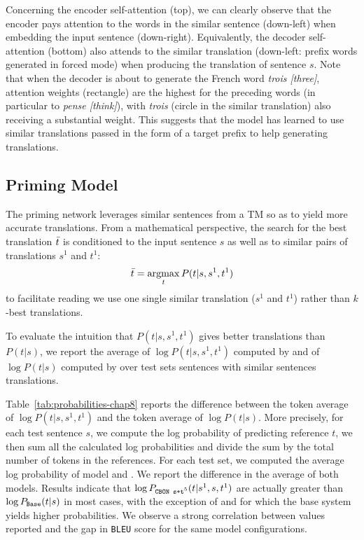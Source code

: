 Concerning the encoder self-attention (top), we can clearly observe that the encoder pays attention to the words in the similar sentence (down-left) when embedding the input sentence (down-right). 
%
Equivalently, the decoder self-attention (bottom) also attends to the similar translation (down-left: prefix words generated in forced mode) when producing the translation of sentence $s$. Note that when the decoder is about to generate the French word {\it trois [three]}, attention weights (rectangle) are the highest for the preceding words (in particular to {\it pense [think]}), with {\it trois} (circle in the similar translation) also receiving a substantial weight.
This suggests that the model has learned to use similar translations passed in the form of a target prefix to help generating translations.

\subsection*{Priming Model} 
The priming network leverages similar sentences from a TM so as to yield more accurate translations. From a mathematical perspective, the search for the best translation $\Bar{t}$ is conditioned to the input sentence $s$ as well as to similar pairs of translations $s^1$ and $t^1$:
\begin{equation*}
    \Bar{t} = \mathop{\operatorname*{argmax}}_{t}P(t|s,s^1,t^1)
\end{equation*}
\noindent to facilitate reading we use one single similar translation ($s^1$ and $t^1$) rather than $k$-best translations.

To evaluate the intuition that $P(t|s, s^1,t^1)$ gives better translations than $P(t|s)$, we report the average of $\log P(t|s,s^1,t^1)$ computed by  and of $\log P(t|s)$ computed by  over test sets sentences with similar sentences translations.

Table~\ref{tab:probabilities-chap8} reports the difference between the token average of $\log P(t|s,s^1,t^1)$ and the token average of $\log P(t|s)$. More precisely, for each test sentence $s$, we compute the log probability of predicting reference $t$, we then sum all the calculated log probabilities and divide the sum by the total number of tokens in the references. For each test set, we computed the average log probability of model  and . We report the difference in the average of both models. 
Results indicate that $\log P_{\texttt{{CBON s+t$^5$}}}(t|s^1,s,t^1)$ are actually greater than $\log P_{\texttt{{Base}}}(t|s)$ in most cases, with the exception of  and  for which the base system yields higher probabilities. We observe a strong correlation between values reported and the gap in \texttt{BLEU} score for the same model configurations.

